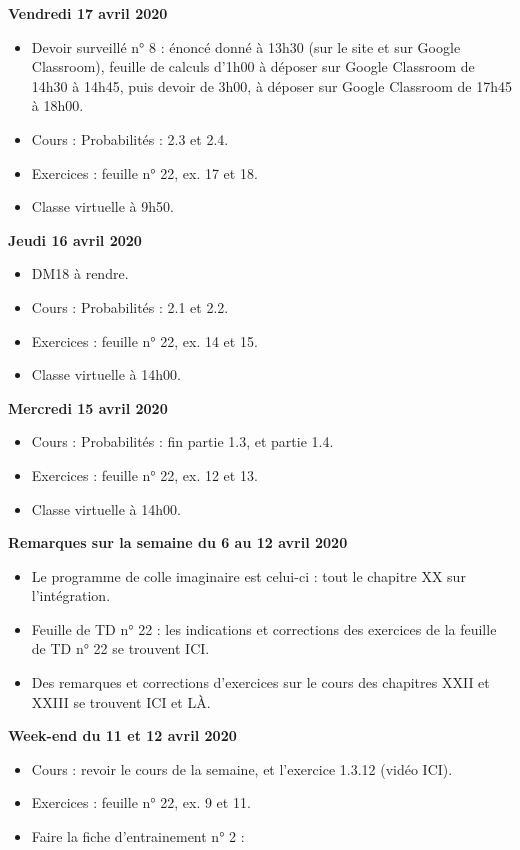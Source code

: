\documentclass[12pt,a4paper]{article}
\begin{document}
\noindent\textbf{\bf Vendredi 17 avril 2020}
\begin{itemize}
\item Devoir surveillé n° 8 : énoncé donné à 13h30 (sur le site et sur Google Classroom), feuille de calculs d'1h00 à déposer sur Google Classroom de 14h30 à 14h45, puis devoir de 3h00, à déposer sur Google Classroom de 17h45 à 18h00.
\item Cours : Probabilités : 2.3 et 2.4.
\item Exercices : feuille n° 22, ex. 17 et 18.
\item Classe virtuelle à 9h50.\vspace{.4cm}
\end{itemize}

\noindent\textbf{Jeudi 16 avril 2020}
\begin{itemize}
\item DM18 à rendre.
\item Cours : Probabilités : 2.1 et 2.2.
\item Exercices : feuille n° 22, ex. 14 et 15.
\item Classe virtuelle à 14h00.\vspace{.4cm}
\end{itemize}

\noindent\textbf{Mercredi 15 avril 2020}
\begin{itemize}
\item Cours : Probabilités : fin partie 1.3, et partie 1.4.
\item Exercices : feuille n° 22, ex. 12 et 13.
\item Classe virtuelle à 14h00.\vspace{.4cm}
\end{itemize}
 
\noindent\textbf{\bf Remarques sur la semaine du 6 au 12 avril 2020}
\begin{itemize}
\item Le programme de colle imaginaire est celui-ci : tout le chapitre XX sur l'intégration.
\item Feuille de TD n° 22 : les indications et corrections des exercices de la feuille de TD n° 22 se trouvent ICI.
\item Des remarques et corrections d'exercices sur le cours des chapitres XXII et XXIII se trouvent ICI et LÀ.\vspace{.4cm}
\end{itemize}

\noindent\textbf{Week-end du 11 et 12 avril 2020}
\begin{itemize}
\item Cours : revoir le cours de la semaine, et l'exercice 1.3.12 (vidéo ICI).
\item Exercices : feuille n° 22, ex. 9 et 11.
\item Faire la fiche d'entrainement n° 2 : 
\vspace{.4cm}
\end{itemize}
\end{document}
